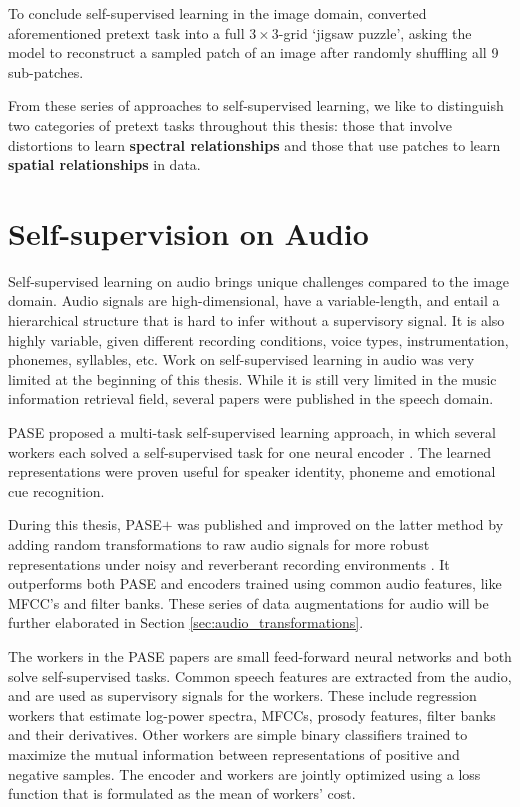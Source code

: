To conclude self-supervised learning in the image domain, \cite{noroozi_unsupervised_2016} converted aforementioned pretext task into a full $3\times 3$-grid `jigsaw puzzle', asking the model to reconstruct a sampled patch of an image after randomly shuffling all 9 sub-patches.

From these series of approaches to self-supervised learning, we like to distinguish two categories of pretext tasks throughout this thesis: those that involve distortions to learn \textbf{spectral relationships} and those that use patches to learn \textbf{spatial relationships} in data.
\\

\section{Self-supervision on Audio}\label{sec:self_supervision_audio}
Self-supervised learning on audio brings unique challenges compared to the image domain.
Audio signals are high-dimensional, have a variable-length, and entail a hierarchical structure that is hard to infer without a supervisory signal.
It is also highly variable, given different recording conditions, voice types, instrumentation, phonemes, syllables, etc.
Work on self-supervised learning in audio was very limited at the beginning of this thesis.
While it is still very limited in the music information retrieval field, several papers were published in the speech domain.

PASE proposed a multi-task self-supervised learning approach, in which several workers each solved a self-supervised task for one neural encoder \cite{Pascual2019}.
The learned representations were proven useful for speaker identity, phoneme and emotional cue recognition.

During this thesis, PASE$+$ was published and improved on the latter method by adding random transformations to raw audio signals for more robust representations under noisy and reverberant recording environments \cite{Ravanelli2020}.
It outperforms both PASE and encoders trained using common audio features, like MFCC's and filter banks. These series of data augmentations for audio will be further elaborated in Section \ref{sec:audio_transformations}.

The workers in the PASE papers are small feed-forward neural networks and both solve self-supervised tasks.
Common speech features are extracted from the audio, and are used as supervisory signals for the workers.
These include regression workers that estimate log-power spectra, MFCCs, prosody features, filter banks and their derivatives.
Other workers are simple binary classifiers trained to maximize the mutual information between representations of positive and negative samples.
The encoder and workers are jointly optimized using a loss function that is formulated as the mean of workers' cost.


